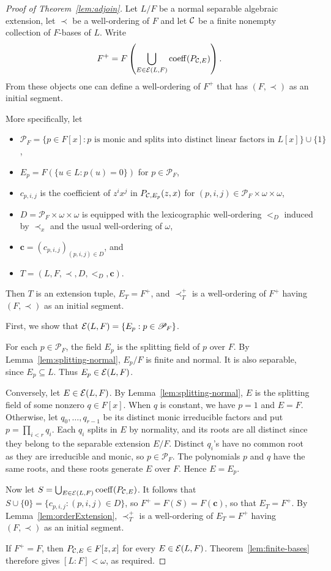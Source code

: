 \begin{proof}[Proof of Theorem~\ref{lem:adjoin}]
Let $L/F$ be a normal separable algebraic extension, let $\prec$ be a
well-ordering of $F$ and let $\mathcal C$ be a finite nonempty collection of
$F$-bases of $L$. Write
\[
 F^+=F\left(\bigcup_{E\in\mathcal E(L,F)}\operatorname{coeff}(P_{\mathcal C,E})\right).
\]
From these objects one can define a well-ordering of $F^+$ that has
$(F,\prec)$ as an initial segment.

More specifically, let
\begin{itemize}
    \item $\mathscr P_F=\{p\in F[x]:p\text{ is monic and splits into distinct linear factors in }L[x]\}\cup\{1\}$,
    \item $E_p=F(\{u\in L:p(u)=0\})$ for $p\in\mathscr P_F$,
    \item $c_{p,i,j}$ is the coefficient of $z^ix^j$ in $P_{\mathcal C,E_p}(z,x)$ for
    $(p,i,j)\in\mathscr P_F\times\omega\times\omega$,
    \item $D=\mathscr P_F\times\omega\times\omega$
    is equipped with the lexicographic well-ordering $<_D$ induced by
    $\prec_x$ and the usual well-ordering of $\omega$,
    \item $\mathbf c=(c_{p,i,j})_{(p,i,j)\in D}$, and
    \item $T=(L,F,\prec,D,<_D,\mathbf c)$.
\end{itemize}
Then $T$ is an extension tuple, $E_T=F^+$, and
$\prec_T^+$ is a well-ordering of $F^+$ having
$(F,\prec)$ as an initial segment.

First, we show that $\mathcal E(L,F)=\{E_p:p\in\mathscr P_F\}$.

For each $p\in\mathscr P_F$, the field $E_p$ is the splitting field of
$p$ over $F$. By Lemma~\ref{lem:splitting-normal}, $E_p/F$ is finite
and normal. It is also separable, since $E_p\subseteq L$. Thus
$E_p\in\mathcal E(L,F)$.

Conversely, let $E\in\mathcal E(L,F)$. By
Lemma~\ref{lem:splitting-normal}, $E$ is the splitting field of some
nonzero $q\in F[x]$. When $q$ is
constant, we have $p=1$ and $E=F$.
Otherwise, let $q_0,\ldots,q_{r-1}$ be its distinct monic
irreducible factors and put $p=\prod_{i<r}q_i$. Each $q_i$ splits in
$E$ by normality, and its roots are all distinct since they belong to the separable
extension $E/F$. Distinct $q_i$'s have no common root as they are irreducible and monic, so
$p\in\mathscr P_F$. The polynomials $p$ and $q$ have the same roots,
and these roots generate $E$ over $F$. Hence $E=E_p$.

Now let $S=\bigcup_{E\in\mathcal E(L,F)}\operatorname{coeff}(P_{\mathcal C,E})$.
It follows that $S\cup\{0\}=\{c_{p,i,j}:(p,i,j)\in D\}$, so $F^+=F(S)=F(\mathbf c)$, so that $E_T=F^+$.
By Lemma~\ref{lem:orderExtension},
$\prec_T^+$ is a well-ordering of $E_T=F^+$ having
$(F,\prec)$ as an initial segment.

If $F^+=F$, then $P_{\mathcal C,E}\in F[z,x]$ for every
$E\in\mathcal E(L,F)$. Theorem~\ref{lem:finite-bases} therefore gives
$[L:F]<\omega$, as required.
\end{proof}

